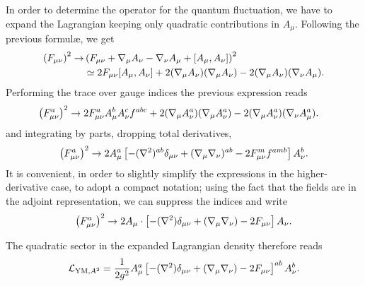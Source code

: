 In order to determine the operator for the quantum fluctuation, we have to expand the Lagrangian keeping only quadratic contributions in $A_\mu$. Following the previous formul\ae{}, we get 
\begin{equation}
\begin{split}
\left( F_{\mu\nu} \right)^2
\rightarrow
&
\left( F_{\mu\nu} +  \covD_\mu A_\nu - \covD_\nu A_\mu + [A_\mu,A_\nu] \right)^2
\\
%
& \simeq
2 F_{\mu\nu} [A_\mu,A_\nu]  + 
2 ( \covD_\mu A_\nu  )( \covD_\mu A_\nu ) - 2 ( \covD_\mu A_\nu  )( \covD_\nu A_\mu).
\end{split}
\end{equation}
Performing the trace over gauge indices the previous expression reads
\begin{equation}
\begin{split}
\left( F^a_{\mu\nu} \right)^2
%
& \rightarrow
2 F^a_{\mu\nu} A^b_\mu A^c_\nu f^{abc} + 
2 ( \covD_\mu A^a_\nu  )( \covD_\mu A^a_\nu ) 
- 2 ( \covD_\mu A^a_\nu  )( \covD_\nu A^a_\mu).
\end{split}
\end{equation}
and integrating by parts, dropping total derivatives,
\begin{equation}\label{YM-operator}
\left( F^a_{\mu\nu} \right)^2
\rightarrow
2  A^a_\mu   \left[
  	- ({ \mathcal{\nabla} }^2)^{ab} \delta_{\mu\nu}  
  	+ ({ \mathcal{\nabla} }_\mu { \mathcal{\nabla} }_\nu)^{ab} 
	- 2 F^m_{\mu\nu} f^{amb} 
  	\right]
 A^b_\nu.
\end{equation}
It is convenient, in order to slightly simplify the expressions in the higher-derivative case, to adopt a compact notation; using the fact that the fields are in the adjoint representation, we can suppress the indices and write
\begin{equation}\label{YM-operator-implicit-indices}
\left( F^a_{\mu\nu} \right)^2
\rightarrow
2  A_\mu  \cdot \left[
  	- ({ \mathcal{\nabla} }^2) \delta_{\mu\nu}  
  	+ ({ \mathcal{\nabla} }_\mu { \mathcal{\nabla} }_\nu)
	- 2 F_{\mu\nu} 
  	\right]
 A_\nu.
\end{equation}

The quadratic sector in the expanded Lagrangian density therefore reads
\begin{equation}\label{L-YMquadr}
\mathcal{L}_{{ \text{YM} }, A^2 } = \frac{1}{2 g^2} 
 A^a_\mu   \left[
  	- ({ \mathcal{\nabla} }^2) \delta_{\mu\nu}  
  	+ ({ \mathcal{\nabla} }_\mu { \mathcal{\nabla} }_\nu) 
	- 2 F_{\mu\nu}
  	\right]^{ab}
 A^b_\nu.
\end{equation}

